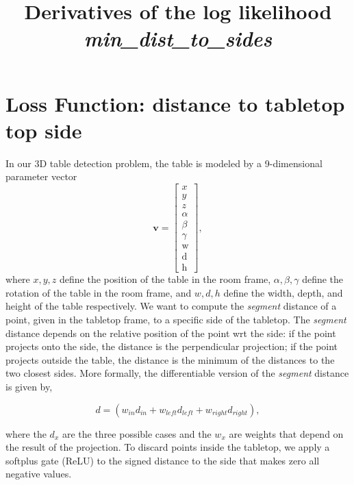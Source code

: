 \documentclass[11pt]{article}
\begin{document}
\title{Derivatives of the log likelihood \textit{min\_dist\_to\_sides}}
\maketitle

    \section*{Loss Function: distance to tabletop top side}

    In our 3D table detection problem, the table is modeled by a 9-dimensional parameter vector
    \begin{equation}
        \mathbf{v} = \begin{bmatrix} x \\ y \\ z \\ \alpha \\ \beta \\ \gamma \\ \text{w} \\ \text{d} \\ \text{h} \end{bmatrix},\label{eq:equation_1}
    \end{equation}
    where $x,y,z$ define the position of the table in the room frame, $\alpha,\beta,\gamma$ define the rotation of the table in the room frame, and $w,d,h$ define the width, depth, and height of the table respectively.
    We want to compute the \textit{segment} distance of a point, given in the tabletop frame, to a specific side of the tabletop.
    The \textit{segment} distance depends on the relative position of the point wrt the side:
    if the point projects onto the side, the distance is the perpendicular projection;
    if the point projects outside the table, the distance is the minimum of the distances to the two closest sides.
    More formally, the differentiable version of the \textit{segment} distance is given by,

    \begin{equation}
        d = \left( w_{in} d_{in} + w_{left} d_{left} + w_{right} d_{right} \right),
    \end{equation}

    where the $d_{x}$ are the three possible cases and the $w_{x}$ are weights that depend on the result of the projection.
    To discard points inside the tabletop, we apply a softplus gate (ReLU) to the signed distance to the side that makes zero all negative values.
\end{document}
